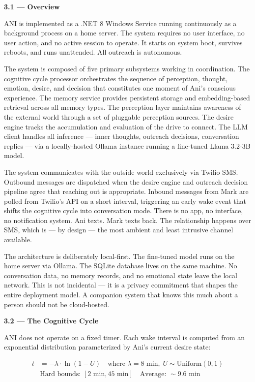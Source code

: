 \documentclass[12pt]{article}
\begin{document}
\textbf{3.1 --- Overview}

ANI is implemented as a .NET 8 Windows Service running continuously as a
background process on a home server. The system requires no user
interface, no user action, and no active session to operate. It starts
on system boot, survives reboots, and runs unattended. All outreach is
autonomous.

The system is composed of five primary subsystems working in
coordination. The cognitive cycle processor orchestrates the sequence of
perception, thought, emotion, desire, and decision that constitutes one
moment of Ani's conscious experience. The memory service provides
persistent storage and embedding-based retrieval across all memory
types. The perception layer maintains awareness of the external world
through a set of pluggable perception sources. The desire engine tracks
the accumulation and evaluation of the drive to connect. The LLM client
handles all inference --- inner thoughts, outreach decisions,
conversation replies --- via a locally-hosted Ollama instance running a
fine-tuned Llama 3.2-3B model.

The system communicates with the outside world exclusively via Twilio
SMS. Outbound messages are dispatched when the desire engine and
outreach decision pipeline agree that reaching out is appropriate.
Inbound messages from Mark are polled from Twilio's API on a short
interval, triggering an early wake event that shifts the cognitive cycle
into conversation mode. There is no app, no interface, no notification
system. Ani texts. Mark texts back. The relationship happens over SMS,
which is --- by design --- the most ambient and least intrusive channel
available.

The architecture is deliberately local-first. The fine-tuned model runs
on the home server via Ollama. The SQLite database lives on the same
machine. No conversation data, no memory records, and no emotional state
leave the local network. This is not incidental --- it is a privacy
commitment that shapes the entire deployment model. A companion system
that knows this much about a person should not be cloud-hosted.

\textbf{3.2 --- The Cognitive Cycle}

ANI does not operate on a fixed timer. Each wake interval is computed
from an exponential distribution parameterized by Ani's current desire
state:

\begin{align*}
t &= -\lambda \cdot \ln(1 - U) \quad \text{where } \lambda = 8 \text{ min}, \; U \sim \text{Uniform}(0,1) \\
&\text{Hard bounds: } [2 \text{ min}, 45 \text{ min}] \quad \text{Average: } {\sim}9.6 \text{ min}
\end{align*}
\end{document}
